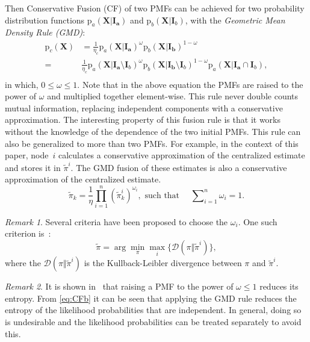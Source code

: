 \documentclass[journal]{IEEEtran}
\newcommand{\vect}[1]{{\mathbf{#1}}}
\theoremstyle{remark}
\newtheorem{remark}{Remark}
\newcommand{\pr}{\textrm{p}}
\theoremstyle{definition}
\begin{document}
Then Conservative Fusion (CF) of two PMFs can be achieved for two probability
distribution functions $\pr_a(\vect{X | \vect{I}_a})$ and $\pr_b(\vect{X} |
\vect{I}_b)$, with the \emph{Geometric Mean Density Rule (GMD)}:
\begin{equation}
\begin{aligned}
\pr_c(\vect{X})&= \frac{1}{\eta_c} \pr_a(\vect{X| \vect{I}_a})^\omega \pr_b(\vect{X| \vect{I}_b})^{1-\omega}\\
=& \frac{1}{\eta_c} \pr_a(\vect{X| \vect{I}_a} \setminus \vect{I}_b)^\omega \pr_b(\vect{X| \vect{I}_b} \setminus \vect{I}_b)^{1-\omega} \pr_a(\vect{X| \vect{I}_a} \cap \vect{I}_b),\\
\end{aligned}
\end{equation}  
in which, $0\leq\omega\leq1$. 
Note that in the above equation the PMFs are raised to the power of $\omega$
and multiplied together element-wise. This rule never double counts mutual
information, replacing independent components with a conservative
approximation. The interesting property of this fusion rule is that it works
without the knowledge of the dependence of the two initial PMFs. This  rule can
also be generalized to more than two PMFs. For example, in the context of this
paper, node~$i$ calculates a conservative approximation of the centralized
estimate and stores it in $\tilde{\pi}^i$. The GMD fusion of these estimates is
also a conservative approximation of the centralized estimate. 
\begin{equation}
\label{eq:CFb}
\tilde{\pi}_{k} =\frac{1}{\eta} \prod_{i=1}^{n} {(\tilde{\pi}_{k}^i)}^{\omega_i},\text{ such that } \quad \textstyle {\sum\nolimits_{i=1}^{n} \omega_i=1}.
\end{equation}

\begin{remark}
 Several criteria have been proposed to choose the $\omega_i$. One such
 criterion is~\cite{ajgl2015design}:
 \begin{equation}
 \label{eq:crit}
 \tilde{\pi}=\arg\min_{\pi}\max_i\{\mathcal{D}(\pi\Vert \tilde{\pi}^{i})\}, \end{equation}
 where the $\mathcal{D}(\pi\Vert \tilde{\pi}^{i})$ is the Kullback-Leibler divergence between $\pi$ and $\tilde{\pi}^i$.
\end{remark}

\begin{remark}
 It is shown in~\cite{bailey2012conservative} that raising a PMF to the power of
 $\omega \leq 1$ reduces its entropy. From \eqref{eq:CFb} it can be seen that
 applying the GMD rule reduces the entropy of the likelihood probabilities that
 are independent. In general, doing so is undesirable 
 and the likelihood probabilities can be treated separately to 
 avoid this.
\end{remark}
\end{document}
